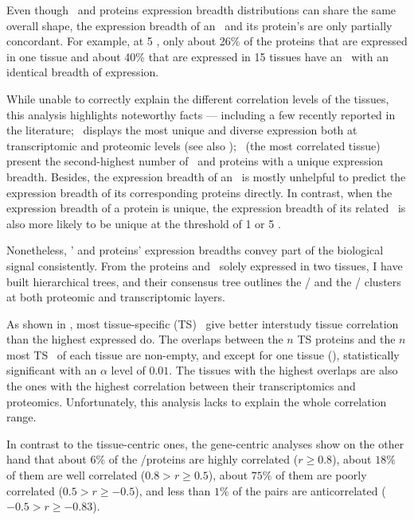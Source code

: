 Even though \mRNAs\ and proteins expression breadth distributions can share
the same overall shape,
the expression breadth of an \mRNA\ and its protein's are only partially concordant.
For example, at 5 \FPKM,
only about 26\% of the proteins that are expressed in one tissue
and about 40\% that are expressed in 15 tissues have
an \mRNA\ with an identical breadth of expression.

While unable to correctly explain the different correlation levels of the tissues,
this analysis highlights noteworthy facts
--- including a few recently reported in the literature;
\testis\ displays the most unique and diverse expression
both at transcriptomic and proteomic levels
(see also \citet{Wang2019-ut,Zhang2015-yn});
\liver\ (the most correlated tissue) present the second-highest number
of \mRNAs\ and proteins with a unique expression breadth.
Besides, the expression breadth of an \mRNA\ is mostly unhelpful
to predict the expression breadth of its corresponding proteins directly.
In contrast, when the expression breadth of a protein is unique,
the expression breadth of its related \mRNA\ is also more likely to be unique
at the threshold of 1 or 5 \FPKM{}.\mybr\

Nonetheless, \mRNAs{}' and proteins' expression breadths convey
part of the biological signal consistently.
From the proteins and \mRNAs\ solely expressed in two tissues,
I have built hierarchical trees,
and their consensus tree outlines
the \ovary{}/\testis{} and the \kidney{}/\liver{} clusters
at both proteomic and transcriptomic layers.\mybr\

As shown in ,
most tissue-specific (\gls{TS}) \mRNAs\ give better
interstudy tissue correlation
than the highest expressed \mRNAs{} do.
The overlaps between the $n$ \gls{TS} proteins and
the $n$ most \gls{TS} \mRNAs\ of each tissue are non-empty,
and except for one tissue (),
statistically significant with an $\alpha$ level of $0.01$.
The tissues with the highest overlaps are
also the ones with the highest correlation
between their transcriptomics and proteomics.
Unfortunately, this analysis lacks to explain
the whole correlation range.\mybr\

In contrast to the tissue-centric ones,
the gene-centric analyses show on the other hand that
about $6\%$ of the \mRNAs/proteins are highly correlated ($r≥0.8$),
about $18\%$ of them are well correlated ($0.8 > r ≥ 0.5$),
about $75\%$ of them are poorly correlated ($0.5 > r ≥ -0.5$), and
less than $1\%$ of the pairs are anticorrelated ($-0.5 > r ≥ -0.83$).

